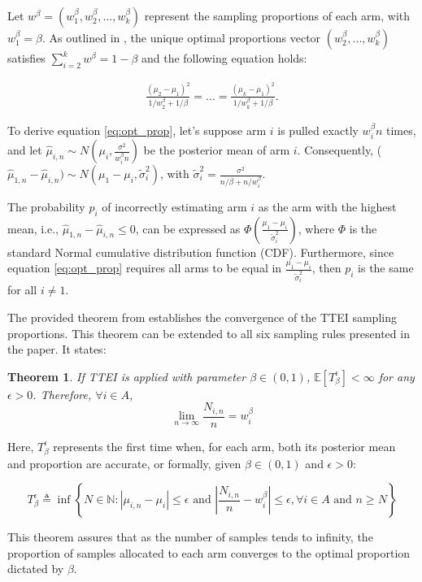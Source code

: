 \documentclass[a4paper, 12pt]{article}
\newtheorem{theorem}{Theorem}[section]
\theoremstyle{definition}
\begin{document}
Let $w^\beta = (w_1^\beta, w_2^\beta,... , w_k^\beta)$ represent the sampling proportions of each arm, with $w_1^\beta = \beta$. As outlined in \cite{ttei}, the unique optimal proportions vector $(w_2^\beta,... , w_k^\beta)$ satisfies $\sum_{i=2}^{k} w^\beta = 1-\beta$ and the following equation holds:

\begin{align} \label{eq:opt_prop}
\frac{(\mu_2-\mu_1)^2}{1/w_2^\beta + 1/\beta} =... = \frac{(\mu_k-\mu_1)^2}{1/w_k^\beta + 1/\beta}.
\end{align}

To derive equation \eqref{eq:opt_prop}, let's suppose arm $i$ is pulled exactly $w_i^\beta n$ times, and let $\hat{\mu}_{i,n} \sim N\left(\mu_i,\frac{\sigma^2}{w_i^\beta n}\right)$ be the posterior mean of arm $i$. Consequently, ($\hat{\mu}_{1,n} - \hat{\mu}_{i,n}) \sim N(\mu_1-\mu_i, \tilde{\sigma}_i^2)$, with $\tilde{\sigma}_i^2 = \frac{\sigma^2}{n/\beta + n/w_i^\beta}$. 

The probability $p_{i}$ of incorrectly estimating arm $i$ as the arm with the highest mean, i.e., $\hat{\mu}_{1,n} - \hat{\mu}_{i,n} \leq 0$, can be expressed as $\Phi\left(\frac{\mu_1-\mu_i}{\tilde{\sigma}_i^2}\right)$, where $\Phi$ is the standard Normal cumulative distribution function (CDF). Furthermore, since equation \eqref{eq:opt_prop} requires all arms to be equal in $\frac{\mu_1-\mu_i}{\tilde{\sigma}_i^2}$, then $p_{i}$ is the same for all $i\neq 1$.

The provided theorem from \cite{ttei} establishes the convergence of the TTEI sampling proportions. This theorem can be extended to all six sampling rules presented in the paper. It states:
\begin{theorem}
If TTEI is applied with parameter $\beta \in (0, 1)$, $\mathbb{E}[T_\beta^	\epsilon] < \infty$ for any $\epsilon > 0$. Therefore, $\forall i\in A$,
\[
\lim_{n\to\infty}\frac{N_{i,n}}{n} = w_i^\beta  
\]
\end{theorem}

Here, $T_\beta^\epsilon$ represents the first time when, for each arm, both its posterior mean and proportion are accurate, or formally, given $\beta \in (0,1)$ and $\epsilon > 0$:

\[
T_\beta^\epsilon \triangleq \inf \left\{N\in\mathbb{N}: |\mu_{i,n}-\mu_i|\leq\epsilon \text{ and } \left|\frac{N_{i,n}}{n}-w_i^\beta\right|\leq\epsilon, \forall i\in A \text{ and } n\geq N\right\}  
\]

This theorem assures that as the number of samples tends to infinity, the proportion of samples allocated to each arm converges to the optimal proportion dictated by $\beta$.
\end{document}
